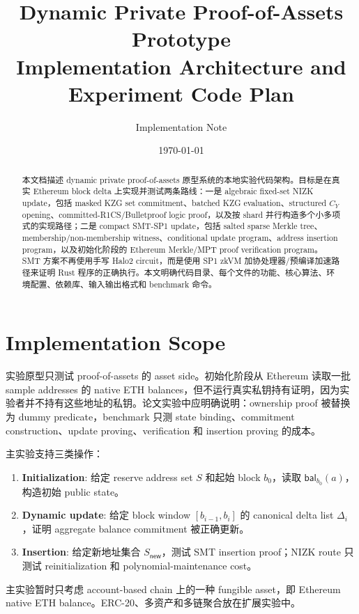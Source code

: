 \documentclass[UTF8,a4paper,11pt]{ctexart}
\title{Dynamic Private Proof-of-Assets Prototype\\Implementation Architecture and Experiment Code Plan}
\author{Implementation Note}
\date{\today}
\newcommand{\bal}{\mathsf{bal}}
\begin{document}
\maketitle

\begin{abstract}
本文档描述 dynamic private proof-of-assets 原型系统的本地实验代码架构。目标是在真实 Ethereum block delta 上实现并测试两条路线：一是 algebraic fixed-set NIZK update，包括 masked KZG set commitment、batched KZG evaluation、structured $C_Y$ opening、committed-R1CS/Bulletproof logic proof，以及按 shard 并行构造多个小多项式的实现路径；二是 compact SMT-SP1 update，包括 salted sparse Merkle tree、membership/non-membership witness、conditional update program、address insertion program，以及初始化阶段的 Ethereum Merkle/MPT proof verification program。SMT 方案不再使用手写 Halo2 circuit，而是使用 SP1 zkVM 加协处理器/预编译加速路径来证明 Rust 程序的正确执行。本文明确代码目录、每个文件的功能、核心算法、环境配置、依赖库、输入输出格式和 benchmark 命令。
\end{abstract}

\tableofcontents

\section{Implementation Scope}

实验原型只测试 proof-of-assets 的 asset side。初始化阶段从 Ethereum 读取一批 sample addresses 的 native ETH balances，但不运行真实私钥持有证明，因为实验者并不持有这些地址的私钥。论文实验中应明确说明：ownership proof 被替换为 dummy predicate，benchmark 只测 state binding、commitment construction、update proving、verification 和 insertion proving 的成本。

主实验支持三类操作：
\begin{enumerate}[leftmargin=2em]
  \item \textbf{Initialization}: 给定 reserve address set $S$ 和起始 block $b_0$，读取 $\bal_{b_0}(a)$，构造初始 public state。
  \item \textbf{Dynamic update}: 给定 block window $[b_{i-1},b_i]$ 的 canonical delta list $\Delta_i$，证明 aggregate balance commitment 被正确更新。
  \item \textbf{Insertion}: 给定新地址集合 $S_{\mathsf{new}}$，测试 SMT insertion proof；NIZK route 只测试 reinitialization 和 polynomial-maintenance cost。
\end{enumerate}

主实验暂时只考虑 account-based chain 上的一种 fungible asset，即 Ethereum native ETH balance。ERC-20、多资产和多链聚合放在扩展实验中。
\end{document}
